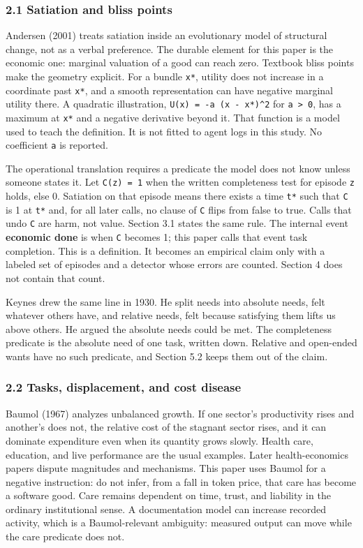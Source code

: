 \documentclass[
  10pt,
]{article}
\begin{document}
\subsubsection{2.1 Satiation and bliss
points}\label{satiation-and-bliss-points}

Andersen (2001) treats satiation inside an evolutionary model of
structural change, not as a verbal preference. The durable element for
this paper is the economic one: marginal valuation of a good can reach
zero. Textbook bliss points make the geometry explicit. For a bundle
\texttt{x*}, utility does not increase in a coordinate past \texttt{x*},
and a smooth representation can have negative marginal utility there. A
quadratic illustration, \texttt{U(x)\ =\ -a\ (x\ -\ x*)\^{}2} for
\texttt{a\ \textgreater{}\ 0}, has a maximum at \texttt{x*} and a
negative derivative beyond it. That function is a model used to teach
the definition. It is not fitted to agent logs in this study. No
coefficient \texttt{a} is reported.

The operational translation requires a predicate the model does not know
unless someone states it. Let \texttt{C(z)\ =\ 1} when the written
completeness test for episode \texttt{z} holds, else 0. Satiation on
that episode means there exists a time \texttt{t*} such that \texttt{C}
is 1 at \texttt{t*} and, for all later calls, no clause of \texttt{C}
flips from false to true. Calls that undo \texttt{C} are harm, not
value. Section 3.1 states the same rule. The internal event
\textbf{economic done} is when \texttt{C} becomes 1; this paper calls
that event task completion. This is a definition. It becomes an
empirical claim only with a labeled set of episodes and a detector whose
errors are counted. Section 4 does not contain that count.

Keynes drew the same line in 1930. He split needs into absolute needs,
felt whatever others have, and relative needs, felt because satisfying
them lifts us above others. He argued the absolute needs could be met.
The completeness predicate is the absolute need of one task, written
down. Relative and open-ended wants have no such predicate, and Section
5.2 keeps them out of the claim.

\subsubsection{2.2 Tasks, displacement, and cost
disease}\label{tasks-displacement-and-cost-disease}

Baumol (1967) analyzes unbalanced growth. If one sector's productivity
rises and another's does not, the relative cost of the stagnant sector
rises, and it can dominate expenditure even when its quantity grows
slowly. Health care, education, and live performance are the usual
examples. Later health-economics papers dispute magnitudes and
mechanisms. This paper uses Baumol for a negative instruction: do not
infer, from a fall in token price, that care has become a software good.
Care remains dependent on time, trust, and liability in the ordinary
institutional sense. A documentation model can increase recorded
activity, which is a Baumol-relevant ambiguity: measured output can move
while the care predicate does not.
\end{document}

